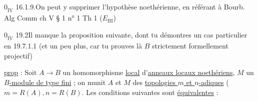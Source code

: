 
$0_{\overline{\underline{\mathrm{IV}}}}$ 16.1.9.\qquad On peut y supprimer l'hypothèse noethérienne, en référant à Bourb. Alg Comm ch V § 1 n° 1 Th 1 ($E_{\mathrm{III}}$)

$0_{\overline{\underline{\mathrm{IV}}}}$ 19.2\qquad Il manque la proposition suivante, dont tu démontres un cas particulier en 19.7.1.1 (et un peu plus, car tu prouves là $B$ strictement formellement projectif)

\uline{prop} : Soit $A\longrightarrow B$ un homomorphisme \uline{local} d'\uline{anneaux locaux noethériens}, \uline{$M$} un \uline{$B$-module de type fini} ; on munit $A$ et $M$ des \uline{topologies $m$ et $n$-adiques} ($m=R(A),n=R(B)$. Les conditions suivantes sont \uline{équivalentes} :
